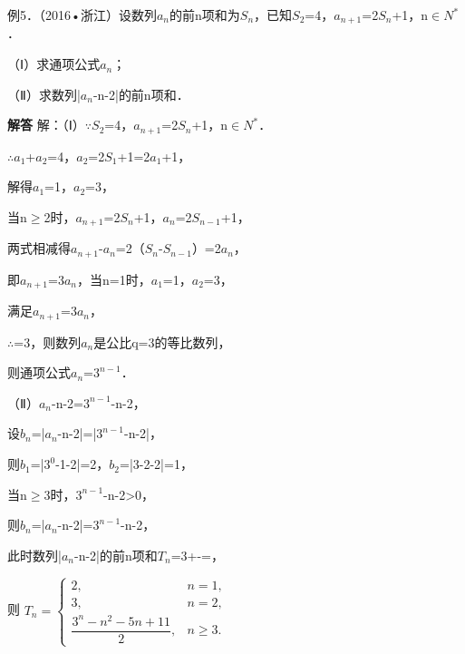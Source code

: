 例5．（2016•浙江）设数列{\ensuremath{a_{n}}}的前n项和为\ensuremath{S_{n}}，已知\ensuremath{S_{2}}=4，\ensuremath{a_{n+1}}=2\ensuremath{S_{n}}+1，n\ensuremath{\in}\ensuremath{N^{*}}．\par
（Ⅰ）求通项公式\ensuremath{a_{n}}；\par
（Ⅱ）求数列{|\ensuremath{a_{n}}-n-2|}的前n项和．\par
\QuestionSpace{4.8cm}
\ifshowanswers
\par\begingroup\color{solutioncolor}\noindent\textbf{解答}\quad
解：（Ⅰ）\ensuremath{\because}\ensuremath{S_{2}}=4，\ensuremath{a_{n+1}}=2\ensuremath{S_{n}}+1，n\ensuremath{\in}\ensuremath{N^{*}}．\par
\ensuremath{\therefore}\ensuremath{a_{1}}+\ensuremath{a_{2}}=4，\ensuremath{a_{2}}=2\ensuremath{S_{1}}+1=2\ensuremath{a_{1}}+1，\par
解得\ensuremath{a_{1}}=1，\ensuremath{a_{2}}=3，\par
当n\ensuremath{\ge}2时，\ensuremath{a_{n+1}}=2\ensuremath{S_{n}}+1，\ensuremath{a_{n}}=2\ensuremath{S_{n-1}}+1，\par
两式相减得\ensuremath{a_{n+1}}-\ensuremath{a_{n}}=2（\ensuremath{S_{n}}-\ensuremath{S_{n-1}}）=2\ensuremath{a_{n}}，\par
即\ensuremath{a_{n+1}}=3\ensuremath{a_{n}}，当n=1时，\ensuremath{a_{1}}=1，\ensuremath{a_{2}}=3，\par
满足\ensuremath{a_{n+1}}=3\ensuremath{a_{n}}，\par
\ensuremath{\therefore}=3，则数列{\ensuremath{a_{n}}}是公比q=3的等比数列，\par
则通项公式\ensuremath{a_{n}}=\ensuremath{3^{n-1}}．\par
（Ⅱ）\ensuremath{a_{n}}-n-2=\ensuremath{3^{n-1}}-n-2，\par
设\ensuremath{b_{n}}=|\ensuremath{a_{n}}-n-2|=|\ensuremath{3^{n-1}}-n-2|，\par
则\ensuremath{b_{1}}=|\ensuremath{3^{0}}-1-2|=2，\ensuremath{b_{2}}=|3-2-2|=1，\par
当n\ensuremath{\ge}3时，\ensuremath{3^{n-1}}-n-2>0，\par
则\ensuremath{b_{n}}=|\ensuremath{a_{n}}-n-2|=\ensuremath{3^{n-1}}-n-2，\par
此时数列{|\ensuremath{a_{n}}-n-2|}的前n项和\ensuremath{T_{n}}=3+-=，\par
则 $T_n=\begin{cases}2,&n=1,\\3,&n=2,\\\dfrac{3^n-n^2-5n+11}{2},&n\geq3.\end{cases}$\par
\par\endgroup\fi

